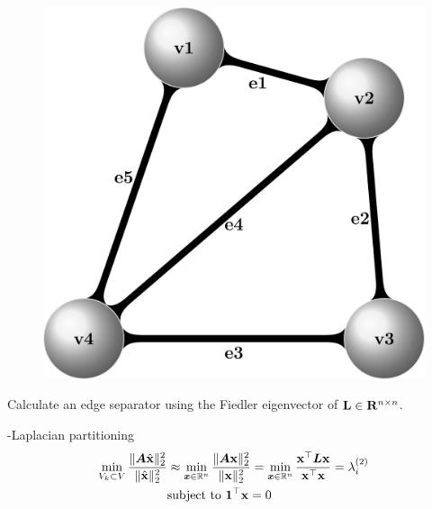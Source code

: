 \documentclass[12pt]{article}
\begin{document}
{{\begin{multicols}{2}
{\begin{minipage}{.45\columnwidth}
\begin{figure}[H]
\includegraphics[width=0.94\columnwidth]{figures/simple_graph_small_bold.png}
\end{figure}
\end{minipage}

\vspace{0.2cm}

\begin{myblock}{}
\centering
Calculate an edge separator using the Fiedler eigenvector of $\mathbf{L}\in{\bf R}^{n \times n}$.
\end{myblock}


\begin{minipage}{.58\columnwidth}
\centering
\vspace{+0.5cm}
\begin{defblock}{
-Laplacian partitioning
}
\centering
\begin{align*}
 \min_{V_k \subset V} \frac{\|\boldsymbol{A}\hat{{\bf x}}\|_2^2}{\|\hat{{\bf x}}\|_2^2}
&\approx
  \min_{\boldsymbol{x} \in \mathbb{R}^n} \frac{\|\boldsymbol{A}{\bf x}\|_2^2}{\|{\bf x}\|_2^2}     
    = \min_{\boldsymbol{x} \in \mathbb{R}^n} \frac{ {\bf x}^\top \boldsymbol{L}{\bf x}}{{\bf x}^\top {\bf x}} = \lambda^{(2)}_i  \\ 
 &\mbox{\rm subject to}{\ } \mathbf{1}^\top {\bf x}  = 0
\end{align*}

\end{defblock}

\vspace{+0.5cm}


\end{minipage}}
\end{multicols}}}
\end{document}
